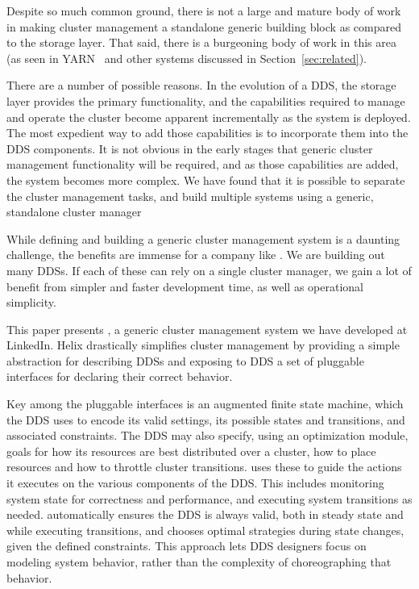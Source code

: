 Despite so much common ground, there is not a large and mature body of work in making cluster management a
 standalone generic building block as compared to the storage layer. 
That said, there is a burgeoning body of work in this area
(as seen in YARN~\cite{yarn} and other systems discussed in
Section~\ref{sec:related}).  

There are a number of possible reasons.  In the evolution of a DDS, the
storage layer provides the primary functionality, and the capabilities required to 
manage and operate the cluster become apparent incrementally as the system is deployed. 
The most expedient way to add those capabilities is to incorporate them into the DDS components.
It is not obvious in the early stages that generic cluster management functionality will be required, 
and as those capabilities are added, the system becomes more complex.  We have found that it is possible 
to separate the cluster management tasks, and build multiple systems using a generic, standalone cluster
 manager 
    
While defining and building a generic cluster management system is a daunting
challenge, the benefits are immense for a company like \linkedin.  We are
building out many DDSs.  If each of these can rely on a single cluster manager,
we gain a lot of benefit from simpler and faster development time, as well as
operational simplicity.  

\textbf{\helix} This paper presents \helix, a generic cluster management system we have developed at LinkedIn.  
\helix Helix drastically simplifies cluster management by providing a simple abstraction for describing DDSs and 
exposing to DDS a set of pluggable interfaces for declaring their correct behavior.


Key among the pluggable interfaces is
an augmented finite state machine, which the DDS uses
to encode its valid settings, \ie its possible states and
transitions, and associated constraints.   The 
DDS may also specify, using an optimization module, goals for how its resources are best distributed over a cluster, \ie
how to place resources and how to throttle cluster transitions.  
\helix uses these to guide the actions it executes on the various
components of the DDS.  This includes monitoring 
system state for correctness and performance, and executing system transitions as
needed.  \helix automatically ensures the DDS is always valid, both in steady state and while
executing transitions, and chooses optimal strategies during state changes, given the defined constraints. 
This approach lets DDS
designers focus on modeling system behavior, rather than the complexity of choreographing 
that behavior.

